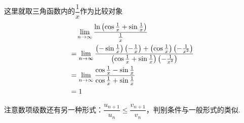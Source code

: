 \begin{analysis}
这里就取三角函数内的$\dfrac{1}{x}$作为比较对象
\[\begin{aligned}
&\quad\displaystyle\lim_{n\to\infty}\dfrac{\ln\left(\cos\frac{1}{x}+\sin\frac{1}{x}\right)}{\frac{1}{x}}\\
&=\displaystyle\lim_{n\to\infty}\dfrac{\left(-\sin\frac{1}{x}\right)\left(-\frac{1}{x}\right)+\left(\cos\frac{1}{x}\right)\left(-\frac{1}{x^2}\right)}{\left(\cos\frac{1}{x}+\sin\frac{1}{x}\right)\left(-\frac{1}{x^2}\right)}\\
&=\displaystyle\lim_{n\to\infty}\dfrac{\cos\frac{1}{x}-\sin\frac{1}{x}}{\cos\frac{1}{x}+\sin\frac{1}{x}}\\
&=1
\end{aligned}\]
\end{analysis}
\par 注意数项级数还有另一种形式：$\dfrac{u_{n+1}}{u_n}\leq\dfrac{v_{n+1}}{v_n}$，判别条件与一般形式的类似.

